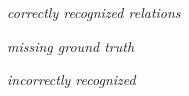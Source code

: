 \documentclass[10pt,twocolumn,letterpaper]{article}
\begin{document}
\begin{figure*}[t]
\centering
\hspace{0.005\textwidth}
	\begin{minipage}[b]{0.60\textwidth}
    	\centering
    	\emph{correctly recognized relations}\\
    	\vspace{0.4ex}
	\end{minipage}
\begin{minipage}[b]{0.19\textwidth}
    	\centering
    	\emph{missing ground truth}\\
    	\vspace{0.4ex}
	\end{minipage}
\begin{minipage}[b]{0.19\textwidth}
    \centering
    \emph{incorrectly recognized}\\
    	\vspace{0.4ex}
	\end{minipage}
	

\end{figure*}
\end{document}
